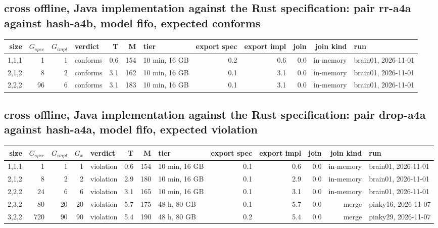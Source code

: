 \documentclass[10pt]{article}
\begin{document}
\subsection*{cross offline, Java implementation against the Rust specification: pair \textsf{rr-a4a} against \textsf{hash-a4b}, model fifo, expected conforms}
\begin{longtable}{@{}rrrlrrlrrrrl@{}}
\toprule
size & $G_{\mathit{spec}}$ & $G_{\mathit{impl}}$ & verdict & T & M & tier & export spec & export impl & join & join kind & run \\
\midrule
\endhead
\color{red} 1,1,1 & 1 & 1 & conforms & 0.6 & 154 & 10 min, 16 GB & 0.2 & 0.6 & 0.0 & in-memory & brain01, 2026-11-01 \\
\color{red} 2,1,2 & 8 & 2 & conforms & 3.1 & 162 & 10 min, 16 GB & 0.1 & 3.1 & 0.0 & in-memory & brain01, 2026-11-01 \\
\color{red} 2,2,2 & 96 & 6 & conforms & 3.1 & 183 & 10 min, 16 GB & 0.1 & 3.1 & 0.0 & in-memory & brain01, 2026-11-01 \\
\bottomrule
\end{longtable}
\subsection*{cross offline, Java implementation against the Rust specification: pair \textsf{drop-a4a} against \textsf{hash-a4a}, model fifo, expected violation}
\begin{longtable}{@{}rrrrlrrlrrrrl@{}}
\toprule
size & $G_{\mathit{spec}}$ & $G_{\mathit{impl}}$ & $G_x$ & verdict & T & M & tier & export spec & export impl & join & join kind & run \\
\midrule
\endhead
\color{red} 1,1,1 & 1 & 1 & 1 & violation & 0.6 & 154 & 10 min, 16 GB & 0.1 & 0.6 & 0.0 & in-memory & brain01, 2026-11-01 \\
\color{red} 2,1,2 & 8 & 2 & 2 & violation & 2.9 & 180 & 10 min, 16 GB & 0.1 & 2.9 & 0.0 & in-memory & brain01, 2026-11-01 \\
\color{red} 2,2,2 & 24 & 6 & 6 & violation & 3.1 & 165 & 10 min, 16 GB & 0.1 & 3.1 & 0.0 & in-memory & brain01, 2026-11-01 \\
\color{red} 2,3,2 & 80 & 20 & 20 & violation & 5.7 & 175 & 48 h, 80 GB & 0.1 & 5.7 & 0.0 & merge & pinky16, 2026-11-07 \\
\color{red} 3,2,2 & 720 & 90 & 90 & violation & 5.4 & 190 & 48 h, 80 GB & 0.2 & 5.4 & 0.0 & merge & pinky29, 2026-11-07 \\
\bottomrule
\end{longtable}
\end{document}
